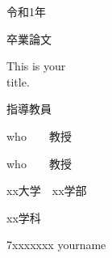 \begin{titlepage}
	\begin{center}

		{\Large 令和1年}

		\vspace{10truept}
		
		{\Large 卒業論文}

		\vspace*{130truept}

	
		{\huge 
			This is your \\
			title. \\
		} 

		\vspace{130truept}

		{\Large 指導教員}

		\vspace{10truept}

        {\Large who　　教授}
        
        \vspace{3truept}

        {\Large who　　教授}

		\vspace{70truept}

		{\Large xx大学　xx学部}

		\vspace{10truept}

		{\Large xx学科}

		\vspace{10truept}

		{\Large 7xxxxxxx yourname}		

	\end{center}
\end{titlepage}